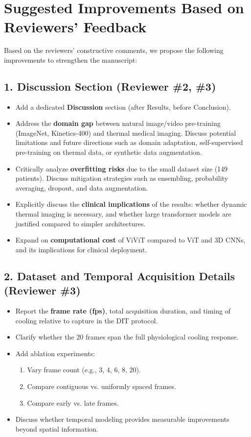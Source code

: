 \section*{Suggested Improvements Based on Reviewers' Feedback}

Based on the reviewers' constructive comments, we propose the following improvements to strengthen the manuscript:

\subsection*{1. Discussion Section (Reviewer \#2, \#3)}
\begin{itemize}
    \item Add a dedicated \textbf{Discussion} section (after Results, before Conclusion).
    \item Address the \textbf{domain gap} between natural image/video
      pre-training (ImageNet, Kinetics-400) and thermal medical
      imaging. Discuss potential limitations and future directions
      such as domain adaptation, self-supervised pre-training on
      thermal data, or synthetic data augmentation.
    \item Critically analyze \textbf{overfitting risks} due to the
      small dataset size (149 patients). Discuss mitigation strategies
      such as ensembling, probability averaging, dropout, and data
      augmentation.
    \item Explicitly discuss the \textbf{clinical implications} of the
      results: whether dynamic thermal imaging is necessary, and
      whether large transformer models are justified compared to
      simpler architectures.
    \item Expand on \textbf{computational cost} of ViViT compared to
      ViT and 3D CNNs, and its implications for clinical deployment.
\end{itemize}

\subsection*{2. Dataset and Temporal Acquisition Details (Reviewer \#3)}
\begin{itemize}
\item Report the \textbf{frame rate (fps)}, total acquisition
  duration, and timing of cooling relative to capture in the DIT
  protocol.
    \item Clarify whether the 20 frames span the full physiological cooling response.
    \item Add ablation experiments:
    \begin{enumerate}
        \item Vary frame count (e.g., 3, 4, 6, 8, 20).
        \item Compare contiguous vs. uniformly spaced frames.
        \item Compare early vs. late frames.
    \end{enumerate}
  \item Discuss whether temporal modeling provides measurable
    improvements beyond spatial information.
\end{itemize}

